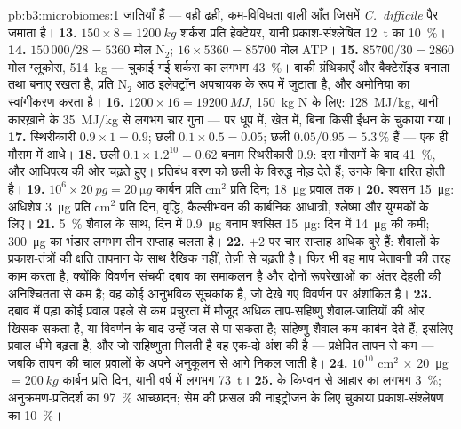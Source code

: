 \begin{solution}{pb:b3:microbiomes:1}
जातियाँ हैं --- वही ढही, कम-विविधता वाली आँत जिसमें
\emph{C.~difficile} पैर जमाता है।
\textbf{13.} $150\times 8 = \qty{1200}{kg}$ शर्करा प्रति हेक्टेयर, यानी
प्रकाश-संश्लेषित \qty{12}{t} का \qty{10}{\%}।
\textbf{14.} $150\,000/28 = 5360$ मोल N$_{2}$; $16\times 5360 =
\num{85700}$ मोल ATP।
\textbf{15.} $\num{85700}/30 = 2860$ मोल ग्लूकोस, \qty{514}{kg} ---
चुकाई गई शर्करा का लगभग \qty{43}{\%}। बाकी ग्रंथिकाएँ और बैक्टेरॉइड
बनाता तथा बनाए रखता है, प्रति N$_{2}$ आठ इलेक्ट्रॉन अपचायक के रूप में
जुटाता है, और अमोनिया का स्वांगीकरण करता है।
\textbf{16.} $1200\times 16 = \qty{19200}{MJ}$, \qty{150}{kg} N के लिए:
\qty{128}{MJ/kg}, यानी कारख़ाने के \qty{35}{MJ/kg} से लगभग चार गुना ---
पर धूप में, खेत में, बिना किसी ईंधन के चुकाया गया।
\textbf{17.} स्थिरीकारी $0.9\times 1 = 0.9$; छली $0.1\times 0.5 =
0.05$; छली $0.05/0.95 = 5.3\,\%$ हैं --- एक ही मौसम में आधे।
\textbf{18.} छली $0.1\times 1.2^{10} = 0.62$ बनाम स्थिरीकारी $0.9$:
दस मौसमों के बाद \qty{41}{\%}, और आधिपत्य की ओर चढ़ते हुए। प्रतिबंध वरण
को छली के विरुद्ध मोड़ देते हैं; उनके बिना  क्षरित होती है।
\textbf{19.} $10^{6}\times \qty{20}{pg} = \qty{20}{\micro g}$ कार्बन
प्रति cm$^{2}$ प्रति दिन; \qty{18}{\micro g} प्रवाल तक।
\textbf{20.} श्वसन \qty{15}{\micro g}: अधिशेष \qty{3}{\micro g}
प्रति cm$^{2}$ प्रति दिन, वृद्धि, कैल्सीभवन की कार्बनिक आधात्री,
श्लेष्मा और युग्मकों के लिए।
\textbf{21.} \qty{5}{\%} शैवाल के साथ, दिन में \qty{0.9}{\micro g}
बनाम श्वसित \qty{15}{\micro g}: दिन में \qty{14}{\micro g} की कमी;
\qty{300}{\micro g} का भंडार लगभग तीन सप्ताह चलता है।
\textbf{22.} $+2$ पर चार सप्ताह अधिक बुरे हैं: शैवालों के
प्रकाश-तंत्रों की क्षति तापमान के साथ रैखिक नहीं, तेज़ी से चढ़ती है।
फिर भी वह माप चेतावनी की तरह काम करता है, क्योंकि विवर्णन संचयी दबाव
का समाकलन है और दोनों रूपरेखाओं का अंतर देहली की अनिश्चितता से कम है;
वह कोई आनुभविक सूचकांक है, जो देखे गए विवर्णन पर अंशांकित है।
\textbf{23.} दबाव में पड़ा कोई प्रवाल पहले से कम प्रचुरता में मौजूद
अधिक ताप-सहिष्णु शैवाल-जातियों की ओर खिसक सकता है, या विवर्णन के बाद
उन्हें जल से पा सकता है; सहिष्णु शैवाल कम कार्बन देते हैं, इसलिए प्रवाल
धीमे बढ़ता है, और जो सहिष्णुता मिलती है वह एक-दो अंश की है ---
प्रक्षेपित तापन से कम --- जबकि तापन की चाल प्रवालों के अपने अनुकूलन से
आगे निकल जाती है।
\textbf{24.} $10^{10}$ cm$^{2}$ $\times$ \qty{20}{\micro g} $=
\qty{200}{kg}$ कार्बन प्रति दिन, यानी वर्ष में लगभग \qty{73}{t}।
\textbf{25.}  के किण्वन से आहार का लगभग \qty{3}{\%};
अनुक्रमण-प्रतिदर्श का \qty{97}{\%} आच्छादन; सेम की फ़सल की नाइट्रोजन के
लिए चुकाया प्रकाश-संश्लेषण का \qty{10}{\%}।
\end{solution}
